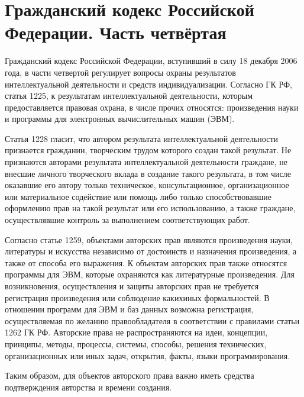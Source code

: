 \section{Гражданский кодекс Российской Федерации. Часть четвёртая} \label{rights_gk}

Гражданский кодекс Российской Федерации, вступивший в силу 18 декабря 2006 года, в части четвертой регулирует вопросы охраны результатов интеллектуальной деятельности и  средств индивидуализации. Согласно ГК РФ, статья 1225, к результатам интеллектуальной деятельности, которым предоставляется правовая охрана, в числе прочих относятся: произведения науки и программы для электронных вычислительных машин (ЭВМ).

\vspace{\baselineskip}
Статья 1228 гласит, что автором результата интеллектуальной деятельности признается гражданин, творческим трудом которого создан такой результат. Не признаются авторами результата интеллектуальной деятельности граждане, не внесшие личного творческого вклада в создание такого результата, в том числе оказавшие его автору только техническое, консультационное, организационное или материальное содействие или помощь либо только способствовавшие оформлению прав на такой результат или его использованию, а также граждане, осуществлявшие контроль за выполнением соответствующих работ.

\vspace{\baselineskip}
Согласно статье 1259, объектами авторских прав являются произведения науки, литературы и искусства независимо от достоинств и назначения произведения, а также от способа его выражения. К объектам авторских прав также относятся программы для ЭВМ, которые охраняются как литературные произведения. Для возникновения, осуществления и защиты авторских прав не требуется регистрация произведения или соблюдение каких иных формальностей. В отношении программ для ЭВМ и баз данных возможна регистрация, осуществляемая по желанию правообладателя в соответствии с правилами статьи 1262 ГК РФ. Авторские права не распространяются на идеи, концепции, принципы, методы, процессы, системы, способы, решения технических, организационных или иных задач, открытия, факты, языки программирования.

\vspace{\baselineskip}
Таким образом, для объектов авторского права важно иметь средства подтверждения авторства и времени создания.